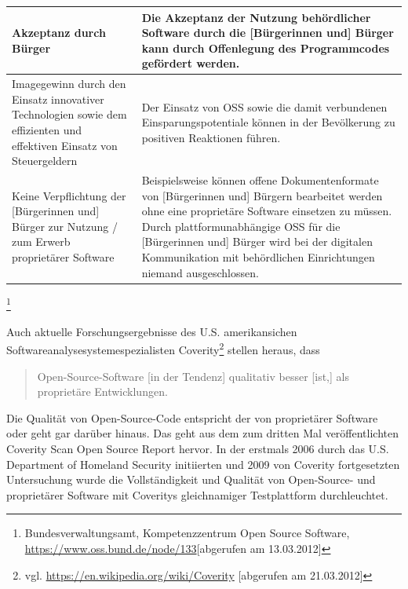 \documentclass[a4paper]{scrartcl}
\begin{document}
\begin{supertabular}{|m{1.8900598in}m{4.77126in}|}

\hline

Akzeptanz durch Bürger &

Die Akzeptanz der Nutzung behördlicher Software durch die [Bürgerinnen und]
Bürger kann durch Offenlegung des Programmcodes gefördert werden.\\

\hline

Imagegewinn durch den Einsatz innovativer Technologien sowie dem effizienten und
effektiven Einsatz von Steuergeldern &

Der Einsatz von OSS sowie die damit verbundenen Einsparungspotentiale können in
der Bevölkerung zu positiven Reaktionen führen.\\

\hline

Keine Verpflichtung der [Bürgerinnen und] Bürger zur Nutzung / zum Erwerb
proprietärer Software &

Beispielsweise können offene Dokumentenformate von [Bürgerinnen und] Bürgern
bearbeitet werden ohne eine proprietäre Software einsetzen zu müssen. Durch
plattformunabhängige OSS für die [Bürgerinnen und] Bürger wird bei der digitalen
Kommunikation mit behördlichen Einrichtungen niemand
ausgeschlossen.\\

\hline
\end{supertabular}
\footnote{Bundesverwaltungsamt, Kompetenzzentrum Open Source Software,
  \url{https://www.oss.bund.de/node/133}[abgerufen am 13.03.2012]}

Auch aktuelle Forschungsergebnisse des U.S. amerikansichen
Softwareanalysesystemespezialisten Coverity\footnote{vgl.
  \url{https://en.wikipedia.org/wiki/Coverity} [abgerufen am 21.03.2012]}
stellen heraus, dass \begin{quote}Open-Source-Software [in der Tendenz]
  qualitativ besser [ist,] als proprietäre Entwicklungen.\end{quote}

Die Qualität von Open-Source-Code entspricht der von proprietärer Software oder
geht gar darüber hinaus. Das geht aus dem zum dritten Mal veröffentlichten
Coverity Scan Open Source Report hervor. In der erstmals 2006 durch das
U.S. Department of Homeland Security initiierten und 2009 von Coverity
fortgesetzten Untersuchung wurde die Vollständigkeit und Qualität von
Open-Source- und proprietärer Software mit Coveritys gleichnamiger Testplattform
durchleuchtet.
\end{document}
